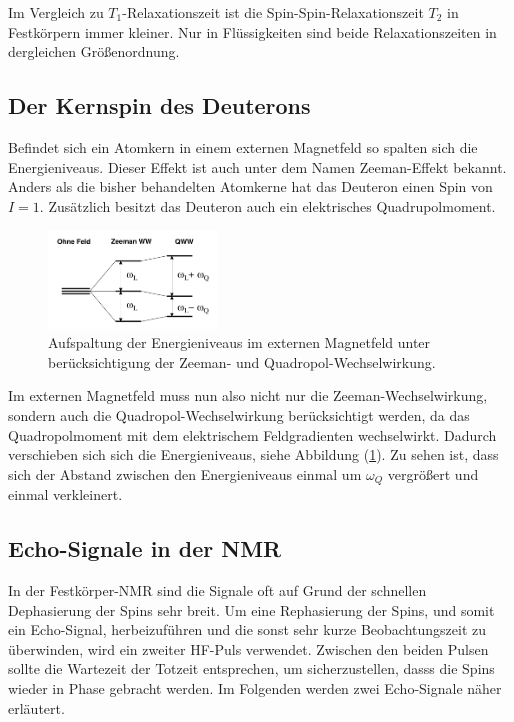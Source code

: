 Im Vergleich zu $T_1$-Relaxationszeit ist die Spin-Spin-Relaxationszeit $T_2$ in Festk\"{o}rpern immer kleiner.
Nur in Fl\"{u}ssigkeiten sind beide Relaxationszeiten in dergleichen Gr\"{o}{\ss}en{\-}ord{\-}nung.

\subsection{Der Kernspin des Deuterons}
Befindet sich ein Atomkern in einem externen Magnetfeld so spalten sich die Energie{\-}ni{\-}veaus.
Dieser Effekt ist auch unter dem Namen Zeeman-Effekt bekannt.
Anders als die bisher behandelten Atomkerne hat das Deuteron einen Spin von $I = 1$.
Zus\"{a}tzlich besitzt das Deuteron auch ein elektrisches Quadrupolmoment.
\begin{figure}[hbtp]
	\centering
	\includegraphics[width=0.4\textwidth]{Plots/aufspaltung.png}
	\caption{Aufspaltung der Energieniveaus im externen Magnetfeld unter ber\"{u}cksichtigung der Zeeman- und Quadropol-Wechselwirkung.}
	\label{QWW}
\end{figure}
Im externen Magnetfeld muss nun also nicht nur die Zeeman-Wechselwirkung, sondern auch die Quadropol-Wechselwirkung ber\"{u}cksichtigt werden, da das Quadropolmoment mit dem elektrischem Feldgradienten wechselwirkt.
Dadurch verschieben sich sich die Energieniveaus, siehe Abbildung (\ref{QWW}).
Zu sehen ist, dass sich der Abstand zwischen den Energieniveaus einmal um $\omega_Q$ vergr\"{o}{\ss}ert und einmal verkleinert.

\subsection{Echo-Signale in der NMR}
In der Festk\"{o}rper-NMR sind die Signale oft auf Grund der schnellen Dephasierung der Spins sehr breit.
Um eine Rephasierung der Spins, und somit ein Echo-Signal, herbeizuf\"{u}hren und die sonst sehr kurze Beobachtungszeit zu \"{u}berwinden, wird ein zweiter HF-Puls verwendet.
Zwischen den beiden Pulsen sollte die Wartezeit der Totzeit entsprechen, um sicherzustellen, dasss die Spins wieder in Phase gebracht werden.
Im Folgenden werden zwei %
Echo-Signale n\"{a}her erl\"{a}utert.

